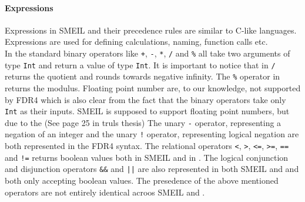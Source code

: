 \paragraph{Expressions}
Expressions in SMEIL and their precedence rules are similar to C-like languages. Expressions are used for defining calculations, naming, function calls etc.\\
In \cspm the standard binary operators like \texttt{+}, \texttt{-}, \texttt{*}, \texttt{/} and \texttt{\%} all take two arguments of type \texttt{Int} and return a value of type \texttt{Int}.
It is important to notice that in \cspm \texttt{/} returns the quotient and rounds towards negative infinity. The \texttt{\%} operator in \cspm returns the modulus.
Floating point number are, to our knowledge, not supported by FDR4\cite{Scattergood2011} which is also clear from the fact that the binary operators take only \texttt{Int} as their inputs. SMEIL is supposed to support floating point numbers, but due to the (See page 25 in truls thesis) %
The unary \texttt{-} operator, representing a negation of an integer and the unary \texttt{!} operator, representing logical negation are both represented in the FDR4 syntax.
The relational operators \texttt{<}, \texttt{>}, \texttt{<=}, \texttt{>=}, \texttt{==} and \texttt{!=} returns boolean values both in SMEIL and in \cspm.
The logical conjunction and disjunction operators \texttt{\&\&} and \texttt{||} are also represented in both SMEIL and \cspm and both only accepting boolean values.
The presedence of the above mentioned operators are not entirely identical acroos SMEIL and \cspm.





